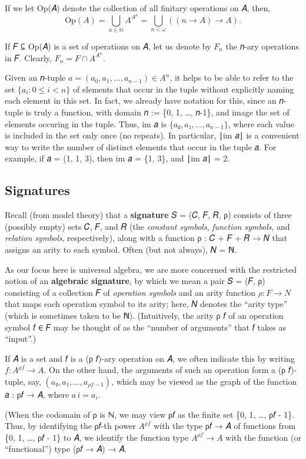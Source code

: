 \documentclass[sigplan,screen]{acmart}
\begin{document}
If we let Op(𝐴) denote the collection of all finitary operations on 𝐴, then,
\[\mathrm{Op}(𝐴) = ⋃_{n ∈ ℕ} A^{A^n} = ⋃_{n<ω} ((𝑛 → A) → A).\]

If 𝐹 ⊆ Op(𝐴) is a set of operations on 𝐴, let us denote by \(𝐹_n\) the 𝑛-ary operations in 𝐹. Clearly, \(F_n = F ∩ A^{A^n}\).

Given an 𝑛-tuple \(a = (a_0, a_1, \dots, a_{n-1}) ∈ A^n\), it helps to be able to refer to the set \(\{a_i : 0 ≤ i < n\}\) of elements that occur in the tuple without explicitly naming each element in this set. In fact, we already have notation for this, since an 𝑛-tuple is truly a function, with domain 𝑛 := \{0, 1, …, 𝑛-1\}, and image the set of
elements occuring in the tuple. Thus, im 𝑎 is \(\{𝑎₀, 𝑎₁, …, 𝑎_{n-1}\}\), where each value is included in the set only once (no repeats). In particular, ∣im 𝑎∣ is a convenient way to write the number of distinct elements that occur in the tuple 𝑎. For example, if 𝑎 = (1, 1, 3), then im 𝑎 = \{1, 3\}, and ∣im 𝑎∣ = 2.

\subsection{Signatures}\label{signatures}
Recall (from model theory) that a \textbf{signature} 𝑆 = (𝐶, 𝐹, 𝑅, ρ) consists of three (possibly empty) sets 𝐶, 𝐹, and 𝑅 (the \emph{constant symbols}, \emph{function symbols}, and \emph{relation symbols}, respectively), along with a function ρ : 𝐶 + 𝐹 + 𝑅 → 𝑁 that assigns an arity to each symbol. Often (but not always), 𝑁 = ℕ.

As our focus here is universal algebra, we are more concerned with the restricted notion of an \textbf{algebraic signature}, by which we mean a pair 𝑆 = (𝐹, ρ) consisting of a collection 𝐹 of \emph{operation symbols} and an arity function \(ρ : 𝐹 → 𝑁\) that maps each operation symbol to its arity; here, 𝑁 denotes the ``arity type'' (which is sometimes taken to be ℕ). (Intuitively, the arity ρ 𝑓 of an operation symbol 𝑓 ∈ 𝐹 may be thought of as the ``number of arguments'' that 𝑓 takes as ``input''.)

If 𝐴 is a set and 𝑓 is a (ρ 𝑓)-ary operation on 𝐴, we often indicate this by writing \(f : A^{ρ f} → A\). On the other hand, the arguments of such an operation form a (ρ 𝑓)-tuple, say, \((𝑎₀, 𝑎₁, …, a_{ρf-1})\), which may be viewed as the graph of the function 𝑎 : ρ𝑓 → 𝐴, where \(𝑎\, 𝑖 = 𝑎_i\).

(When the codomain of ρ is ℕ, we may view ρ𝑓 as the finite set \{0, 1, …, ρ𝑓 - 1\}. Thus, by identifying the ρ𝑓-th power \(A^{ρf}\) with the type ρ𝑓 → 𝐴 of functions from \{0, 1, …, ρ𝑓 - 1\} to 𝐴, we identify the function type \(A^{ρf} → A\) with the function (or ``functional'') type (ρ𝑓 → 𝐴) → 𝐴.
\end{document}
